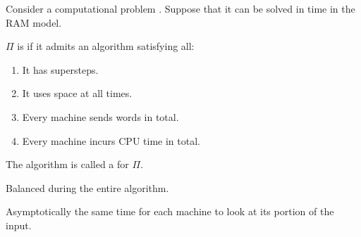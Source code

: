 \documentclass{beamer}
\def\vgap{\vspace{5mm}}
\begin{document}
\begin{frame}
\begin{small}
    
    \vgap 
    
    Consider a computational problem \red{$\Pi$}. Suppose that it can be solved in  time  in the RAM model. 
    
    \pause
    
    \vgap 
    
    \begin{tcolorbox}[arc=0mm, colframe=blue!50!black, colback=blue!10!white] 
    $\Pi$ is  if it admits an algorithm satisfying all:  
    \begin{enumerate} 
        \item It has  supersteps. 
        \item It uses  space at all times.
        \item Every machine sends  words in total. 
        \item Every machine incurs  CPU time in total. 
%   
    \end{enumerate}
    \vgap
    The algorithm is called a  for $\Pi$.
    \end{tcolorbox} 
    
%      
%     
% 
\end{small}
\end{frame}
\begin{frame}
\begin{small}
    
    \vgap 
    
    
    \pause
    \vgap
    
    
    Balanced during the entire algorithm. 
    
    \pause
    \vgap
    
    
    Asymptotically the same time for each machine to look at its portion of the input.
\end{small}
\end{frame}
\end{document}
